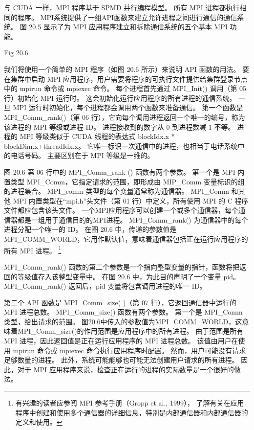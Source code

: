 与 CUDA 一样，MPI 程序基于 SPMD 并行编程模型。 所有 MPI 进程都执行相同的程序。 
MPI系统提供了一组API函数来建立允许进程之间进行通信的通信系统。 
图 20.5 显示了为 MPI 应用程序建立和拆除通信系统的五个基本 MPI 功能。

{\color{red} Fig 20.6}

我们将使用一个简单的 MPI 程序（如图 20.6 所示）来说明 API 函数的用法。 
要在集群中启动 MPI 应用程序，用户需要将程序的可执行文件提供给集群登录节点中的 mpirun 命令或 mpiexec 命令。 
每个进程首先通过 MPI\_Init() 调用（第 05 行）初始化 MPI 运行时。 这会初始化运行应用程序的所有进程的通信系统。 
一旦 MPI 运行时初始化，每个进程都会调用两个函数来准备通信。 
第一个函数是 MPI\_Comm\_rank()（第 06 行），它向每个调用进程返回一个唯一的编号，称为该进程的 MPI 等级或进程 ID。 
进程接收到的数字从 0 到进程数减 1 不等。 
进程的 MPI 等级类似于 CUDA 线程的表达式 blockIdx.x * blockDim.x+threadIdx.x。 
它唯一标识一次通信中的进程，也相当于电话系统中的电话号码。 
主要区别在于 MPI 等级是一维的。

图 20.6 第 06 行中的 MPI\_Comm\_rank () 函数有两个参数。
 第一个是 MPI 内置类型 MPI\_Comm，它指定请求的范围，即形成由 MIP\_Comm 变量标识的组的进程集合。 
 MPI\_comm 类型的每个变量通常称为通信器。 
 MPI\_Comm 和其他 MPI 内置类型在“mpi.h”头文件（第 01 行）中定义，所有使用 MPI 的 C 程序文件都应包含该头文件。 
 一个MPI应用程序可以创建一个或多个通信器，每个通信器都是一组用于通信目的的MPI进程。 
 MPI\_Comm\_rank() 为通信器中的每个进程分配一个唯一的 ID。 
 在图 20.6 中，传递的参数值是 MPI\_COMM\_WORLD，它用作默认值，意味着通信器包括正在运行应用程序的所有 MPI 进程。 
\footnote{有兴趣的读者应参阅 MPI 参考手册（Gropp et al., 1999），
了解有关在应用程序中创建和使用多个通信器的详细信息，特别是内部通信器和内部通信器的定义和使用。}

MPI\_Comm\_rank() 函数的第二个参数是一个指向整型变量的指针，函数将把返回的等级值存入该整型变量中。 
在图 20.6 中，为此目的声明了一个变量 pid。 MPI\_Comm\_rank() 返回后，pid 变量将包含调用进程的唯一 ID。

第二个 API 函数是 MPI\_Comm\_size( )（第 07 行），它返回通信器中运行的 MPI 进程总数。 
MPI\_Comm\_size() 函数有两个参数。 第一个是 MPI\_Comm 类型，给出请求的范围。 
图20.6中传入的参数值为MPI\_COMM\_WORLD，这意味着MPI\_Comm\_size()的作用范围是应用程序中的所有进程。 
由于范围是所有 MPI 进程，因此返回值是正在运行应用程序的 MPI 进程总数。 
该值由用户在使用 mpirun 命令或 mpiexec 命令执行应用程序时配置。 然而，用户可能没有请求足够数量的进程。 
此外，系统可能能够也可能无法创建用户请求的所有进程。 
因此，对于 MPI 应用程序来说，检查正在运行的进程的实际数量是一个很好的做法。

